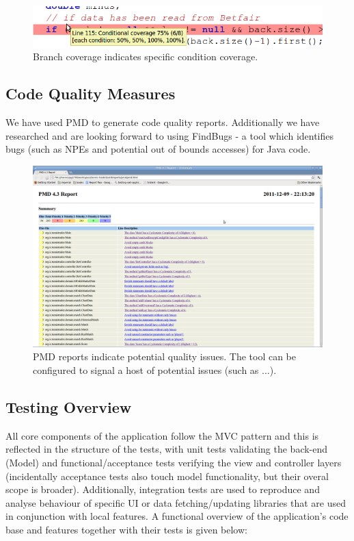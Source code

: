 \documentclass[10pt]{article}
\begin{document}
\begin{figure}[ht]
\centering
\includegraphics[bb=0 0 700 100, scale = 0.49]{branch.png}
\caption{Branch coverage indicates specific condition coverage.}
\end{figure}

\subsection{Code Quality Measures}

We have used PMD to generate code quality reports. Additionally we have researched and are looking forward to using FindBugs - a tool which identifies bugs (such as NPEs and potential out of bounds accesses) for Java code.

\begin{figure}[ht]
\centering
\includegraphics[bb=0 0 1680 1050, scale = 0.2]{pmd.png}
\caption{PMD reports indicate potential quality issues. The tool can be configured to signal a host of potential issues (such as ...).}
\end{figure}

\subsection{Testing Overview}

All core components of the application follow the MVC pattern and this is reflected in the structure of the tests, with unit tests validating the back-end (Model) and functional/acceptance tests verifying the view and controller layers (incidentally acceptance tests also touch model functionality, but their overal scope is broader). Additionally, integration tests are used to reproduce and analyse behaviour of specific UI or data fetching/updating libraries that are used in conjunction with local features. A functional overview of the application's code base and features together with their tests is given below:
\end{document}
